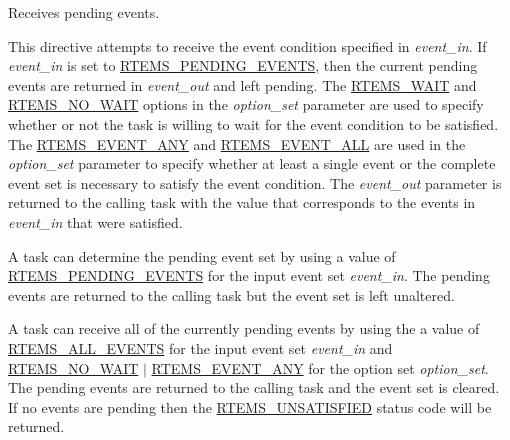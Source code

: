 Receives pending events. 

This directive attempts to receive the event condition specified in {\itshape event\+\_\+in}. If {\itshape event\+\_\+in} is set to \mbox{\hyperlink{group__ClassicEvent_ga803a2cd3251ce738676d7f988082a1cf}{R\+T\+E\+M\+S\+\_\+\+P\+E\+N\+D\+I\+N\+G\+\_\+\+E\+V\+E\+N\+TS}}, then the current pending events are returned in {\itshape event\+\_\+out} and left pending. The \mbox{\hyperlink{group__ClassicOptions_ga6c344518194b529f32555ad5a9f85613}{R\+T\+E\+M\+S\+\_\+\+W\+A\+IT}} and \mbox{\hyperlink{group__ClassicOptions_gad525b4743e16aabd538fb492b71ba21d}{R\+T\+E\+M\+S\+\_\+\+N\+O\+\_\+\+W\+A\+IT}} options in the {\itshape option\+\_\+set} parameter are used to specify whether or not the task is willing to wait for the event condition to be satisfied. The \mbox{\hyperlink{group__ClassicOptions_ga164c17066d5d7f90e8626bfc0f6b6249}{R\+T\+E\+M\+S\+\_\+\+E\+V\+E\+N\+T\+\_\+\+A\+NY}} and \mbox{\hyperlink{group__ClassicOptions_gafe88e8efae3e200e7fec8bd894dc09ec}{R\+T\+E\+M\+S\+\_\+\+E\+V\+E\+N\+T\+\_\+\+A\+LL}} are used in the {\itshape option\+\_\+set} parameter to specify whether at least a single event or the complete event set is necessary to satisfy the event condition. The {\itshape event\+\_\+out} parameter is returned to the calling task with the value that corresponds to the events in {\itshape event\+\_\+in} that were satisfied.

A task can determine the pending event set by using a value of \mbox{\hyperlink{group__ClassicEvent_ga803a2cd3251ce738676d7f988082a1cf}{R\+T\+E\+M\+S\+\_\+\+P\+E\+N\+D\+I\+N\+G\+\_\+\+E\+V\+E\+N\+TS}} for the input event set {\itshape event\+\_\+in}. The pending events are returned to the calling task but the event set is left unaltered.

A task can receive all of the currently pending events by using the a value of \mbox{\hyperlink{group__ClassicEventSet_gab923e5b97e0670c3678eacef83fb97fe}{R\+T\+E\+M\+S\+\_\+\+A\+L\+L\+\_\+\+E\+V\+E\+N\+TS}} for the input event set {\itshape event\+\_\+in} and \mbox{\hyperlink{group__ClassicOptions_gad525b4743e16aabd538fb492b71ba21d}{R\+T\+E\+M\+S\+\_\+\+N\+O\+\_\+\+W\+A\+IT}} $\vert$ \mbox{\hyperlink{group__ClassicOptions_ga164c17066d5d7f90e8626bfc0f6b6249}{R\+T\+E\+M\+S\+\_\+\+E\+V\+E\+N\+T\+\_\+\+A\+NY}} for the option set {\itshape option\+\_\+set}. The pending events are returned to the calling task and the event set is cleared. If no events are pending then the \mbox{\hyperlink{group__ClassicStatus_gga545d41846817eaba6143d52ee4d9e9fea20ba7719ec954c175943fe22aa5ff221}{R\+T\+E\+M\+S\+\_\+\+U\+N\+S\+A\+T\+I\+S\+F\+I\+ED}} status code will be returned.

